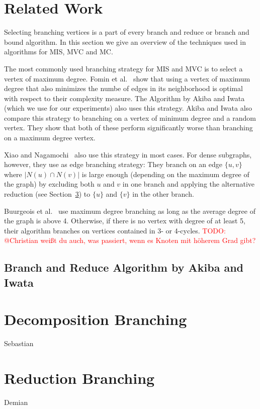 \documentclass[a4paper,UKenglish,cleveref, autoref, thm-restate]{lipics-v2021}
\begin{document}
\section{Related Work}
Selecting branching vertices is a part of every branch and reduce or branch and
bound algorithm. In this section we give an overview of the techniques used in
algorithms for MIS, MVC and MC.

The most commonly used branching strategy for MIS and MVC is to select a vertex
of maximum degree. Fomin et al.~\cite{Fomin} show that using a vertex of maximum
degree that also minimizes the numbe of edges in its neighborhood is optimal
with respect to their complexity measure. The Algorithm by Akiba and Iwata~\cite{AkibaIwata}
(which we use for our experiments) also uses this strategy. Akiba and Iwata also
compare this strategy to branching on a vertex of minimum degree and a random
vertex. They show that both of these perform significantly worse than branching
on a maximum degree vertex.

Xiao and Nagamochi~\cite{XiaoNagamochi} also use
this strategy in most cases. For dense subgraphs, however, they use as edge
branching strategy: They branch on an edge $\{u, v\}$ where $|N(u) \cap N(v)|$
is large enough (depending on the maximum degree of the graph) by
excluding both $u$ and $v$ in one branch and applying the alternative reduction
(see Section~\ref{sec:reduction_branching}) to $\{u\}$ and $\{v\}$ in the other branch.

Buurgeois et al.~\cite{Bourgeois} use maximum degree branching as long as the
average degree of the graph is above 4. Otherwise, if there is no vertex with degree of at least 5, their algorithm branches on vertices
contained in 3- or 4-cycles. \textcolor{red}{TODO: @Christian weißt du auch, was
passiert, wenn es Knoten mit höherem Grad gibt?}

\subsection{Branch and Reduce Algorithm by Akiba and Iwata~\cite{AkibaIwata}}

\section{Decomposition Branching}
Sebastian

\section{Reduction Branching}
\label{sec:reduction_branching}
Demian
\end{document}
